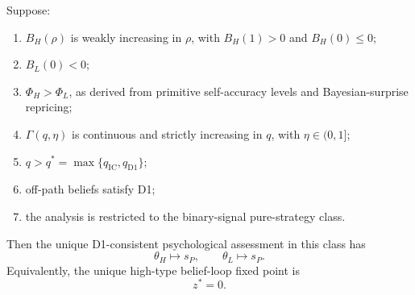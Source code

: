 \begin{theorem}
\label{thm:belief-loop-fixed-point}
Suppose:
\begin{enumerate}
\item \(B_H(\rho)\) is weakly increasing in \(\rho\), with \(B_H(1)>0\) and \(B_H(0)\le 0\);
\item \(B_L(0)<0\);
\item \(\Phi_H>\Phi_L\), as derived from primitive self-accuracy levels and Bayesian-surprise repricing;
\item \(\Gamma(q,\eta)\) is continuous and strictly increasing in \(q\), with \(\eta \in (0,1]\);
\item \(q>q^*=\max\{q_{\mathrm{IC}},q_{\mathrm{D1}}\}\);
\item off-path beliefs satisfy D1;
\item the analysis is restricted to the binary-signal pure-strategy class.
\end{enumerate}
Then the unique D1-consistent psychological assessment in this class has
\[
\theta_H\mapsto s_P,
\qquad
\theta_L\mapsto s_P.
\]
Equivalently, the unique high-type belief-loop fixed point is
\[
z^*=0.
\]
\end{theorem}

